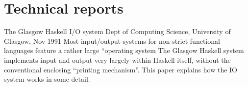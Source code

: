 \section{Technical reports}

{The Glasgow Haskell I/O system}
{Dept of Computing Science, University of Glasgow, Nov 1991}
{
Most input/output systems for non-strict functional languages
feature a rather large ``operating system
The Glasgow Haskell system implements input and output
very largely within Haskell itself, without the conventional
enclosing ``printing mechanism''.  This paper explains how the 
IO system works in some detail.
}


